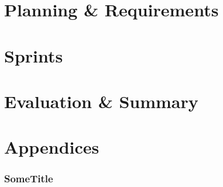 \documentclass{article}
\begin{document}
\renewcommand{\thepage}{\roman{page}}


\abstract{}

\newpage


\newpage
\setcounter{page}{1}
\renewcommand{\thepage}{\arabic{page}}

\newpage
\part{Planning \& Requirements}

\newpage


\newpage


\newpage


\newpage


\newpage


\newpage
\part{Sprints}

\newpage


\newpage


\newpage


\newpage
\part{Evaluation \& Summary}

\newpage


\newpage


\newpage


\newpage


\newpage


\newpage
\part{Appendices}

\appendix

\newpage
\section{SomeTitle}
\end{document}
